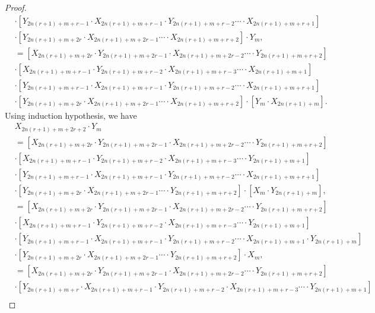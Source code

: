 \begin{proof}
\begin{align*}
&\cdot\left[Y_{2n(r+1)+m+r-1}\cdot X_{2n(r+1)+m+r-1}\cdot Y_{2n(r+1)+m+r-2}\cdots\cdot X_{2n(r+1)+m+r+1}\right]\\&\cdot\left[Y_{2n(r+1)+m+2r}\cdot X_{2n(r+1)+m+2r-1}\cdots\cdot X_{2n(r+1)+m+r+2}\right]\cdot Y_{m},\\
&=\left[X_{2n(r+1)+m+2r}\cdot Y_{2n(r+1)+m+2r-1}\cdot X_{2n(r+1)+m+2r-2}\cdots\cdot Y_{2n(r+1)+m+r+2}\right]\\
&\cdot\left[X_{2n(r+1)+m+r-1}\cdot Y_{2n(r+1)+m+r-2}\cdot X_{2n(r+1)+m+r-3}\cdots\cdot X_{2n(r+1)+m+1}\right]\\
&\cdot\left[Y_{2n(r+1)+m+r-1}\cdot X_{2n(r+1)+m+r-1}\cdot Y_{2n(r+1)+m+r-2}\cdots\cdot X_{2n(r+1)+m+r+1}\right]\\&\cdot\left[Y_{2n(r+1)+m+2r}\cdot X_{2n(r+1)+m+2r-1}\cdots\cdot X_{2n(r+1)+m+r+2}\right]\cdot \left[Y_{m}\cdot X_{2n(r+1)+m}\right].
	\end{align*}
	Using induction hypothesis, we have
\begin{align*}
&X_{2n(r+1)+m+2r+2}\cdot Y_{m}\\&=\left[X_{2n(r+1)+m+2r}\cdot Y_{2n(r+1)+m+2r-1}\cdot X_{2n(r+1)+m+2r-2}\cdots\cdot Y_{2n(r+1)+m+r+2}\right]\\
&\cdot\left[X_{2n(r+1)+m+r-1}\cdot Y_{2n(r+1)+m+r-2}\cdot X_{2n(r+1)+m+r-3}\cdots\cdot Y_{2n(r+1)+m+1}\right]\\
&\cdot\left[Y_{2n(r+1)+m+r-1}\cdot X_{2n(r+1)+m+r-1}\cdot Y_{2n(r+1)+m+r-2}\cdots\cdot X_{2n(r+1)+m+r+1}\right]\\&\cdot\left[Y_{2n(r+1)+m+2r}\cdot X_{2n(r+1)+m+2r-1}\cdots\cdot Y_{2n(r+1)+m+r+2}\right]\cdot \left[X_{m}\cdot Y_{2n(r+1)+m}\right],\\
&=\left[X_{2n(r+1)+m+2r}\cdot Y_{2n(r+1)+m+2r-1}\cdot X_{2n(r+1)+m+2r-2}\cdots\cdot Y_{2n(r+1)+m+r+2}\right]\\
&\cdot\left[X_{2n(r+1)+m+r-1}\cdot Y_{2n(r+1)+m+r-2}\cdot X_{2n(r+1)+m+r-3}\cdots\cdot Y_{2n(r+1)+m+1}\right]\\
&\cdot\left[Y_{2n(r+1)+m+r-1}\cdot X_{2n(r+1)+m+r-1}\cdot Y_{2n(r+1)+m+r-2}\cdots\cdot X_{2n(r+1)+m+1}\cdot Y_{2n(r+1)+m}\right]\\
&\cdot\left[Y_{2n(r+1)+m+2r}\cdot X_{2n(r+1)+m+2r-1}\cdots\cdot Y_{2n(r+1)+m+r+2}\right]\cdot X_{m},\\
&=\left[X_{2n(r+1)+m+2r}\cdot Y_{2n(r+1)+m+2r-1}\cdot X_{2n(r+1)+m+2r-2}\cdots\cdot Y_{2n(r+1)+m+r+2}\right]\\
&\cdot\left[Y_{2n(r+1)+m+r}\cdot X_{2n(r+1)+m+r-1}\cdot Y_{2n(r+1)+m+r-2}\cdot X_{2n(r+1)+m+r-3}\cdots\cdot Y_{2n(r+1)+m+1}\right]\\

\end{align*}
\end{proof}
